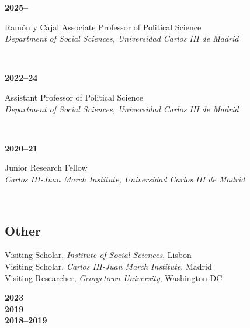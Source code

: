 \documentclass[a4paper, 12pt]{article}
\begin{document}
\begin{minipage}[t]{0.12\textwidth}
\textbf{2025--}
\end{minipage}\hfill\begin{minipage}[t]{0.88\textwidth}
Ramón y Cajal Associate Professor of Political Science\\
\textit{Department of Social Sciences, Universidad Carlos III de Madrid}\\\vspace{-8pt}
\end{minipage}\\
\begin{minipage}[t]{0.12\textwidth}
\textbf{2022--24}
\end{minipage}\hfill\begin{minipage}[t]{0.88\textwidth}
Assistant Professor of Political Science\\
\textit{Department of Social Sciences, Universidad Carlos III de Madrid}\\\vspace{-8pt}
\end{minipage}\\
\begin{minipage}[t]{0.12\textwidth}
\textbf{2020--21}
\end{minipage}\hfill\begin{minipage}[t]{0.88\textwidth}
Junior Research Fellow\\
\textit{Carlos III-Juan March Institute, Universidad Carlos III de Madrid}\\\vspace{-8pt}
\end{minipage}\\

\vspace{-10pt}
\subsection*{Other}

\begin{minipage}[t]{0.82\textwidth}
  Visiting Scholar, \textit{Institute of Social Sciences}, Lisbon\vspace{2pt}\\
  Visiting Scholar, \textit{Carlos III-Juan March Institute}, Madrid\vspace{2pt}\\
	Visiting Researcher, \textit{Georgetown University}, Washington DC
\end{minipage}
\begin{minipage}[t]{0.18\textwidth}
  \flushright
	\textbf{2023}\\\vspace{7pt}
  \textbf{2019}\\\vspace{7pt}
	\textbf{2018--2019}
\end{minipage}
\end{document}
